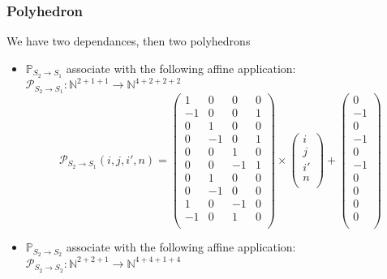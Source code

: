 			\subsubsection{Polyhedron}

We have two dependances, then two polyhedrons 
\begin{itemize}
	\item $\mathbb{P}_{S_{2} \rightarrow S_{1}}$ associate with the following affine application:\\
	$\mathcal{P}_{S_{2} \rightarrow S_{1}}: \mathbb{N}^{2 + 1 + 1} \rightarrow  \mathbb{N}^{4 + 2 + 2 + 2} $\\
	$$\mathcal{P}_{S_{2} \rightarrow S_{1}}(i, j, i', n) = 
	\begin{pmatrix}
		1  & 0  & 0  & 0 \\
		-1 & 0  & 0  & 1 \\
		0  & 1  & 0  & 0 \\
		0  & -1 & 0  & 1 \\
		0  & 0  & 1  & 0 \\
		0  & 0  & -1 & 1 \\
		0  & 1  & 0  & 0 \\
		0  & -1 & 0  & 0 \\
		1  & 0  & -1 & 0 \\
		-1 & 0  & 1  & 0 \\
	\end{pmatrix}
	\times
	\begin{pmatrix}
		i  \\
		j  \\
		i' \\
		n  \\
	\end{pmatrix}
	+
	\begin{pmatrix}
		0  \\
		-1 \\
		0  \\
		-1 \\
		0  \\
		-1 \\
		0  \\
		0  \\
		0  \\
		0  \\
	\end{pmatrix}$$
	\item $\mathbb{P}_{S_{2} \rightarrow S_{2}}$ associate with the following affine application:\\
	$\mathcal{P}_{S_{2} \rightarrow S_{2}}: \mathbb{N}^{2 + 2 + 1} \rightarrow  \mathbb{N}^{4 + 4 + 1 + 4} $\\

\end{itemize}
